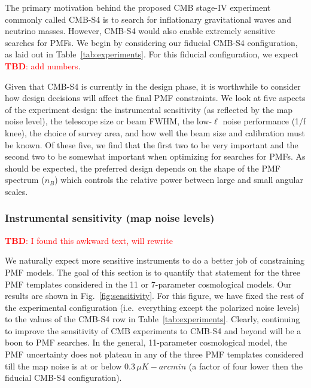 \documentclass[apj]{emulateapj}
\newcommand{\ukarcmin}{\ensuremath{\mu}K-arcmin}
\newcommand{\tbd}[1]{\textcolor{Red}{{\bf TBD}: #1}}
\begin{document}
The primary motivation behind the proposed CMB stage-IV experiment commonly called CMB-S4 is to search for inflationary gravitational waves and neutrino masses.
However, CMB-S4 would also enable extremely sensitive searches for PMFs. 
We begin by considering our fiducial CMB-S4 configuration, as laid out in Table~\ref{tab:experiments}. 
For this fiducial configuration, we expect \tbd{add numbers}. 


Given that CMB-S4 is currently in the design phase, it is worthwhile to consider how design decisions will affect the final PMF constraints. 
We look at five aspects of the experiment design: the instrumental sensitivity (as reflected by the map noise level), the telescope size or beam FWHM,  the low-$\ell$ noise performance (1/f knee), the choice of survey area,  and how well the beam size and calibration must be known. 
Of these five, we find that the first two to be very important and the second two to be somewhat important when optimizing for searches for PMFs. 
As should be expected, the preferred design depends on the shape of the PMF spectrum ($n_B$) which controls  the relative power between large and small angular scales. 

\subsubsection{Instrumental sensitivity (map noise levels)}

\tbd{I found this awkward text, will rewrite}

We naturally expect more sensitive instruments to do a better job of constraining PMF models. 
The goal of this section is to quantify that statement for the three PMF templates considered in the 11 or 7-parameter cosmological models. 
Our results are shown in Fig.~\ref{fig:sensitivity}. 
For this figure, we have fixed the rest of the experimental configuration (i.e.~everything except the polarized noise levels) to the values of the CMB-S4 row in Table~\ref{tab:experiments}. 
Clearly, continuing to improve the sensitivity of CMB experiments to CMB-S4 and beyond will be a boon to PMF searches. 
In the general, 11-parameter cosmological model, the PMF uncertainty does not plateau in any of the three PMF templates considered till the map noise is at or below $0.3\,\ukarcmin$ (a factor of four lower then the fiducial CMB-S4 configuration). 
\end{document}
